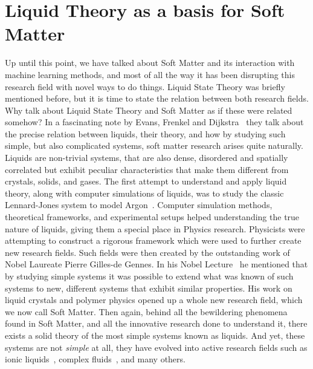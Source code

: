 \section{Liquid Theory as a basis for Soft Matter}
Up until this point, we have talked about Soft Matter and its interaction with machine
learning methods, and most of all the way it has been disrupting this research field
with novel ways to do things. Liquid State Theory was briefly mentioned before,
but it is time to state the relation between both research fields.
Why talk about Liquid State Theory and Soft Matter as if these were related somehow?
In a fascinating note by Evans, Frenkel and Dijkstra~\cite{evansSimpleLiquidsColloids2019}
they talk about the precise relation between liquids, their theory, and how by studying
such simple, but also complicated systems, soft matter research arises quite naturally.
Liquids are non-trivial systems, that are also dense, disordered and spatially correlated
but exhibit peculiar characteristics that make them different from crystals, solids,
and gases. The first attempt to understand and apply liquid theory,
along with computer simulations of liquids, was to study the
classic Lennard-Jones system to model Argon~\cite{mcdonaldCalculationThermodynamicProperties1967,verletComputerExperimentsClassical1967a}. 
Computer simulation methods, theoretical frameworks, and experimental setups helped 
understanding the true nature of liquids, giving them a special place in Physics research. 
Physicists were attempting to construct a rigorous framework which were used to 
further create new research fields.
Such fields were then created by the outstanding work of Nobel Laureate Pierre Gilles-de 
Gennes. In his Nobel Lecture~\cite{degennesSoftMatter1992} he mentioned that by studying 
simple systems it was possible to extend what was known of such systems to new, different 
systems that exhibit similar properties. His work on liquid crystals and polymer physics 
opened up a whole new research field, which we now call Soft Matter.
Then again, behind all the bewildering phenomena found in Soft Matter, and all the 
innovative research done to understand it, there exists a solid theory of the most simple 
systems known as liquids. And yet, these systems are not \emph{simple} at all, they
have evolved into active research fields such as ionic liquids~\cite{rogersIonicLiquidsSolvents2003}, complex fluids~\cite{gelbartNewScienceComplex1996},
and many others.

